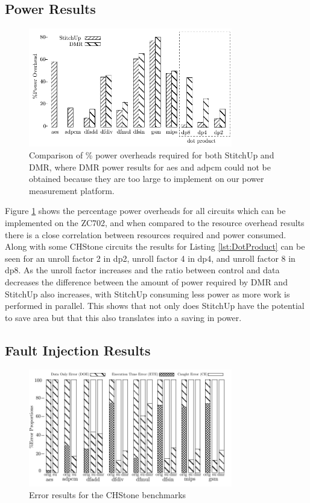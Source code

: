 \subsection{Power Results}
\begin{figure}[h]
\centering
\includegraphics[width=3.5in]{./graphs/power_results.pdf}
\caption{Comparison of \% power overheads required for both StitchUp and DMR, where DMR power results for aes and adpcm could
not be obtained because they are too large to implement on our power measurement platform.}
\label{fig:power_res}
\end{figure}

Figure \ref{fig:power_res} shows the percentage power overheads for all circuits which can be implemented on the ZC702,
and when compared to the resource overhead results there is a close correlation between resources required and power consumed.
Along with some CHStone circuits the results for Listing \ref{lst:DotProduct} can be seen for an unroll factor 2 in dp2, unroll factor 4 in dp4,
and unroll factor 8 in dp8.
As the unroll factor increases and the ratio between control and data decreases the difference between the amount of power required by DMR and StitchUp also
increases, with StitchUp consuming less power as more work is performed in parallel.
This shows that not only does StitchUp have the potential to save area but that this also translates into a
saving in power.

\subsection{Fault Injection Results}

\begin{figure}[t]
\centering
\includegraphics[width=3.5in]{./graphs/errors_res.pdf}
\caption{Error results for the CHStone benchmarks}
\label{fig:error_res}
\end{figure}

